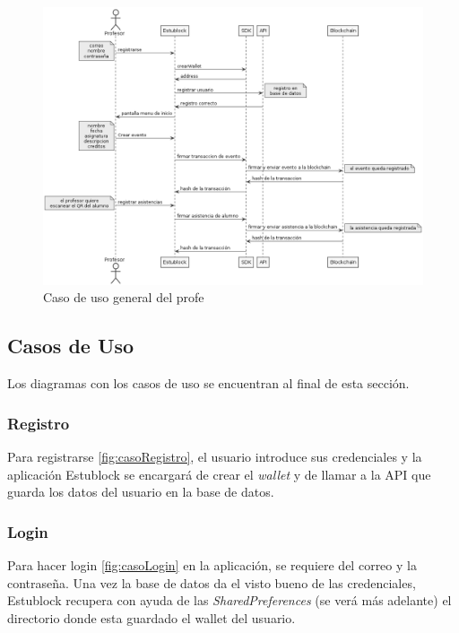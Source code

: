 \begin{landscape}
\begin{figure}[h!]
  \centering
  \includegraphics[scale=0.5]{figs/Desarrollo/CasosUso/generalProfe}
  \caption[Caso de uso general del profe]{Caso de uso general del profe}
  \label{fig:uso_profe}
\end{figure}
\end{landscape}

\clearpage
\subsection{Casos de Uso}
\label{sec:casosUso}

Los diagramas con los casos de uso se encuentran al final de esta sección.

\subsubsection{Registro}

Para registrarse \ref{fig:casoRegistro}, el usuario introduce sus credenciales y la aplicación Estublock se encargará de crear el \emph{wallet} y de llamar a la API que guarda los datos del usuario en la base de datos.

\subsubsection{Login}

Para hacer login \ref{fig:casoLogin} en la aplicación, se requiere del correo y la contraseña. Una vez la base de datos da el visto bueno de las credenciales, Estublock recupera con ayuda de las \emph{SharedPreferences} (se verá más adelante) el directorio donde esta guardado el wallet del usuario.

